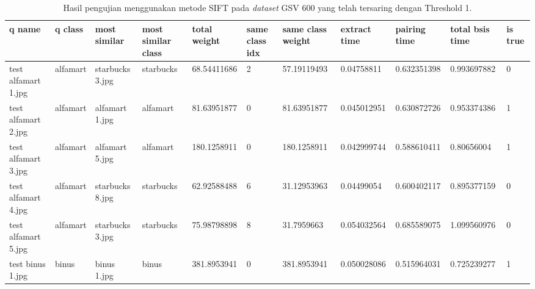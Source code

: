\begin{landscape}
	\begin{longtable}{|p{2cm}|p{1.5cm}|p{2cm}|p{1.5cm}|p{2cm}|p{1cm}|p{2cm}|p{2cm}|p{2cm}|p{2cm}|p{1cm}|}
		\caption{Hasil pengujian menggunakan metode SIFT pada \textit{dataset} GSV 600 yang telah tersaring dengan Threshold 1.} \\
		\hline
		\textbf{q name}      & \textbf{q class} & \textbf{most similar} & \textbf{most similar class} & \textbf{total weight} & \textbf{same class idx} & \textbf{same class weight} & \textbf{extract time} & \textbf{pairing time} & \textbf{total bsis time} & \textbf{is true} \\ \hline
		test alfamart 1.jpg  & alfamart         & starbucks 3.jpg       & starbucks                   & 68.54411686           & 2                       & 57.19119493                & 0.04758811            & 0.632351398           & 0.993697882              & 0                \\ \hline
		test alfamart 2.jpg  & alfamart         & alfamart 1.jpg        & alfamart                    & 81.63951877           & 0                       & 81.63951877                & 0.045012951           & 0.630872726           & 0.953374386              & 1                \\ \hline
		test alfamart 3.jpg  & alfamart         & alfamart 5.jpg        & alfamart                    & 180.1258911           & 0                       & 180.1258911                & 0.042999744           & 0.588610411           & 0.80656004               & 1                \\ \hline
		test alfamart 4.jpg  & alfamart         & starbucks 8.jpg       & starbucks                   & 62.92588488           & 6                       & 31.12953963                & 0.04499054            & 0.600402117           & 0.895377159              & 0                \\ \hline
		test alfamart 5.jpg  & alfamart         & starbucks 3.jpg       & starbucks                   & 75.98798898           & 8                       & 31.7959663                 & 0.054032564           & 0.685589075           & 1.099560976              & 0                \\ \hline
		test binus 1.jpg     & binus            & binus 1.jpg           & binus                       & 381.8953941           & 0                       & 381.8953941                & 0.050028086           & 0.515964031           & 0.725239277              & 1                \\ \hline

\end{longtable}
\end{landscape}
